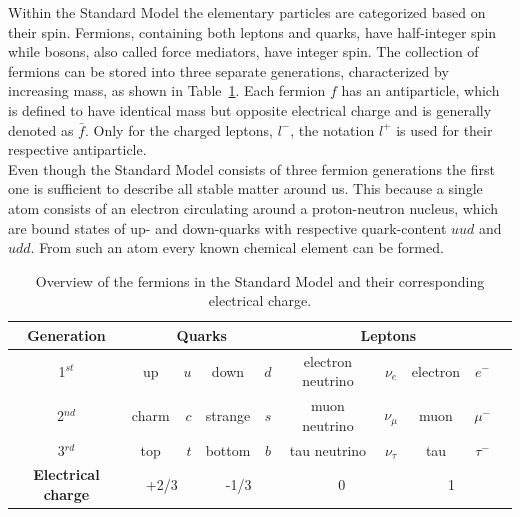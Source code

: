 Within the Standard Model the elementary particles are categorized based on their spin. Fermions, containing both leptons and quarks, have half-integer spin while bosons, also called force mediators, have integer spin. 
The collection of fermions can be stored into three separate generations, characterized by increasing mass, as shown in Table~\ref{table::ElemParticles}.  Each fermion $f$ has an antiparticle, which is defined to have identical mass but opposite electrical charge and is generally denoted as $\bar{f}$. 
Only for the charged leptons, $l^{-}$, the notation $l^{+}$ is used for their respective antiparticle.
\\
Even though the Standard Model consists of three fermion generations the first one is sufficient to describe all stable matter around us.
This because a single atom consists of an electron circulating around a proton-neutron nucleus, which are bound states of up- and down-quarks with respective quark-content $uud$ and $udd$. From such an atom every known chemical element can be formed. 
\setlength\extrarowheight{5pt}
\begin{table}[h!t]
 \centering
 \caption{Overview of the fermions in the Standard Model and their corresponding electrical charge.} \label{table::ElemParticles}
 \begin{tabular}{|c|cr|cc|cc|cc|c|}
  \hline
  \textbf{Generation} 		& \multicolumn{4}{c|}{\textbf{Quarks}} 				& \multicolumn{4}{c|}{\textbf{Leptons}} 				\\
  \hline
  1$^{st}$ 			& up 		& $u$ 		& down 		& $d$ 		& electron neutrino	& $\nu_{e}$ 	& electron	& $e^{-}$ 	\\
  \hline
  2$^{nd}$ 			& charm 	& $c$ 		& strange 	& $s$		& muon neutrino		& $\nu_{\mu}$ 	& muon		& $\mu^{-}$ 	\\
  \hline
  3$^{rd}$ 			& top		& $t$ 		& bottom 	& $b$ 		& tau neutrino 		& $\nu_{\tau}$ 	& tau		& $\tau^{-}$ 	\\
  \hline
  \hline
  \textbf{Electrical charge} 	& \multicolumn{2}{c|}{+2/3} 	& \multicolumn{2}{c|}{-1/3} 	& \multicolumn{2}{c|}{0} 		& \multicolumn{2}{c|}{1}	\\
  \hline
 \end{tabular}
\end{table}

